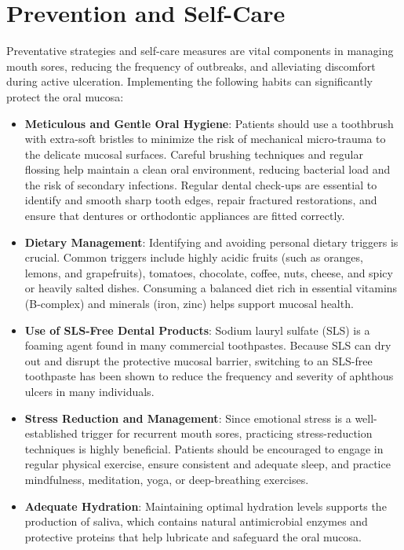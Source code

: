 \section*{Prevention and Self-Care}
Preventative strategies and self-care measures are vital components in managing mouth sores, reducing the frequency of outbreaks, and alleviating discomfort during active ulceration. Implementing the following habits can significantly protect the oral mucosa:
\begin{itemize}
    \item \textbf{Meticulous and Gentle Oral Hygiene}: Patients should use a toothbrush with extra-soft bristles to minimize the risk of mechanical micro-trauma to the delicate mucosal surfaces. Careful brushing techniques and regular flossing help maintain a clean oral environment, reducing bacterial load and the risk of secondary infections. Regular dental check-ups are essential to identify and smooth sharp tooth edges, repair fractured restorations, and ensure that dentures or orthodontic appliances are fitted correctly.
    \item \textbf{Dietary Management}: Identifying and avoiding personal dietary triggers is crucial. Common triggers include highly acidic fruits (such as oranges, lemons, and grapefruits), tomatoes, chocolate, coffee, nuts, cheese, and spicy or heavily salted dishes. Consuming a balanced diet rich in essential vitamins (B-complex) and minerals (iron, zinc) helps support mucosal health.
    \item \textbf{Use of SLS-Free Dental Products}: Sodium lauryl sulfate (SLS) is a foaming agent found in many commercial toothpastes. Because SLS can dry out and disrupt the protective mucosal barrier, switching to an SLS-free toothpaste has been shown to reduce the frequency and severity of aphthous ulcers in many individuals.
    \item \textbf{Stress Reduction and Management}: Since emotional stress is a well-established trigger for recurrent mouth sores, practicing stress-reduction techniques is highly beneficial. Patients should be encouraged to engage in regular physical exercise, ensure consistent and adequate sleep, and practice mindfulness, meditation, yoga, or deep-breathing exercises.
    \item \textbf{Adequate Hydration}: Maintaining optimal hydration levels supports the production of saliva, which contains natural antimicrobial enzymes and protective proteins that help lubricate and safeguard the oral mucosa.
\end{itemize}

